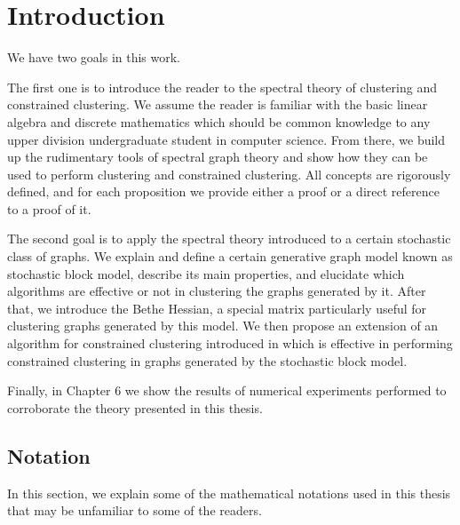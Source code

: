 \tableofcontents
\listoffigures
\listoftables

\pagebreak \setcounter{page}{1}


\chapter{Introduction}
We have two goals in this work.

The first one is to introduce the reader to the spectral theory of clustering and constrained clustering.
We assume the reader is familiar with the basic linear algebra and discrete mathematics which should be common knowledge to any upper division undergraduate student in computer science.
From there, we build up the rudimentary tools of spectral graph theory and show how they can be used to perform clustering and constrained clustering.
All concepts are rigorously defined, and for each proposition we provide either a proof or a direct reference to a proof of it.

The second goal is to apply the spectral theory introduced to a certain stochastic class of graphs. We explain and define a certain generative graph model known as stochastic block model, describe its main properties, and elucidate which algorithms are effective or not in clustering the graphs generated by it.
After that, we introduce the Bethe Hessian, a special matrix particularly useful for clustering graphs generated by this model.
We then propose an extension of an algorithm for constrained clustering introduced in \cite{fastge2} which is effective in performing constrained clustering in graphs generated by the stochastic block model.

Finally, in Chapter 6 we show the results of numerical experiments performed to corroborate the theory presented in this thesis.

\section{Notation}
In this section, we explain some of the mathematical notations used in this thesis that may be unfamiliar to some of the readers.


